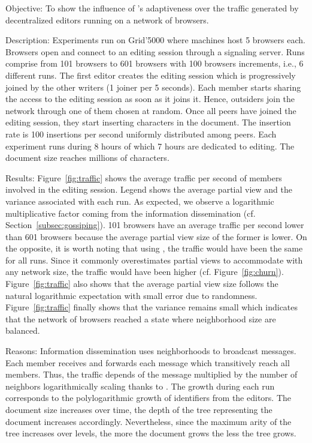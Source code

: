 \begin{asparadesc}
\item [Objective:] To show the influence of \SPRAY's adaptiveness over the
  traffic generated by decentralized editors running on a network of browsers.
\item [Description:] Experiments run on Grid'5000 where machines host 5 browsers
  each. Browsers open \CRATE and connect to an editing session through a
  signaling server.  Runs comprise from 101 browsers to 601 browsers with 100
  browsers increments, i.e., 6 different runs.  The first editor creates the
  editing session which is progressively joined by the other writers (1 joiner
  per 5 seconds). Each member starts sharing the access to the editing session
  as soon as it joins it. Hence, outsiders join the network through one of them
  chosen at random. Once all peers have joined the editing session, they start
  inserting characters in the document. The insertion rate is 100 insertions per
  second uniformly distributed among peers. Each experiment runs during 8 hours
  of which 7 hours are dedicated to editing. The document size reaches millions
  of characters.
\item [Results:] Figure~\ref{fig:traffic} shows the average traffic per second
  of members involved in the editing session. Legend shows the average partial
  view and the variance associated with each run. As expected, we observe a
  logarithmic multiplicative factor coming from the information dissemination
  (cf. Section~\ref{subsec:gossiping}). 101 browsers have an average traffic per
  second lower than 601 browsers because the average partial view size of the
  former is lower.  On the opposite, it is worth noting that using \CYCLON, the
  traffic would have been the same for all runs. Since it commonly overestimates
  partial views to accommodate with any network size, the traffic would have
  been higher (cf. Figure~\ref{fig:churn}).  Figure~\ref{fig:traffic} also shows
  that the average partial view size follows the natural logarithmic expectation
  with small error due to randomness. Figure~\ref{fig:traffic} finally shows
  that the variance remains small which indicates that the network of browsers
  reached a state where neighborhood size are balanced.
\item [Reasons:] Information dissemination uses neighborhoods to broadcast
  messages. Each member receives and forwards each message which transitively
  reach all members. Thus, the traffic depends of the message multiplied by the
  number of neighbors logarithmically scaling thanks to \SPRAY. The growth
  during each run corresponds to the polylogarithmic growth of identifiers from
  the editors. The document size increases over time, the depth of the \LSEQ
  tree representing the document increases accordingly. Nevertheless, since the
  maximum arity of the tree increases over levels, the more the document grows
  the less the tree grows.
\end{asparadesc}
